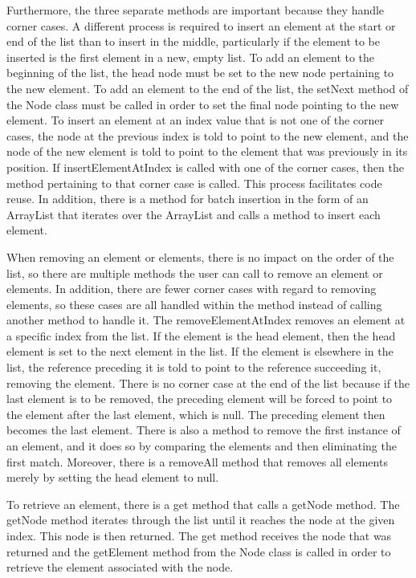 \documentclass[12pt]{scrartcl} %
\begin{document}
    Furthermore, the three separate methods are important because they handle corner cases.  A different process is required to insert an element at the start or end of the list than to insert in the middle, particularly if the element to be inserted is the first element in a new, empty list.  To add an element to the beginning of the list, the head node must be set to the new node pertaining to the new element.  To add an element to the end of the list, the setNext method of the Node class must be called in order to set the final node pointing to the new element.  To insert an element at an index value that is not one of the corner cases, the node at the previous index is told to point to the new element, and the node of the new element is told to point to the element that was previously in its position.  If insertElementAtIndex is called with one of the corner cases, then the method pertaining to that corner case is called.  This process facilitates code reuse.  In addition, there is a method for batch insertion in the form of an ArrayList that iterates over the ArrayList and calls a method to insert each element.

    When removing an element or elements, there is no impact on the order of the list, so there are multiple methods the user can call to remove an element or elements.  In addition, there are fewer corner cases with regard to removing elements, so these cases are all handled within the method instead of calling another method to handle it.  The removeElementAtIndex removes an element at a specific index from the list.  If the element is the head element, then the head element is set to the next element in the list.  If the element is elsewhere in the list, the reference preceding it is told to point to the reference succeeding it, removing the element.  There is no corner case at the end of the list because if the last element is to be removed, the preceding element will be forced to point to the element after the last element, which is null.  The preceding element then becomes the last element.  There is also a method to remove the first instance of an element, and it does so by comparing the elements and then eliminating the first match.  Moreover, there is a removeAll method that removes all elements merely by setting the head element to null.

    To retrieve an element, there is a get method that calls a getNode method.  The getNode method iterates through the list until it reaches the node at the given index.  This node is then returned.  The get method receives the node that was returned and the getElement method from the Node class is called in order to retrieve the element associated with the node.
\end{document}
